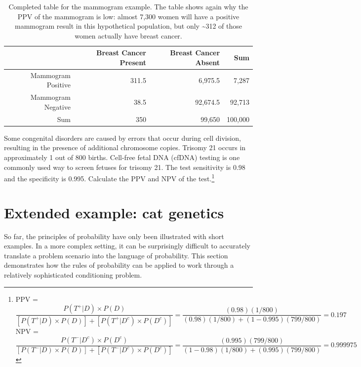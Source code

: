 \begin{table}[ht]
	\centering
	\begin{tabular}{rrrr}
		\hline
		& Breast Cancer Present & Breast Cancer Absent & Sum \\ 
		\hline
		Mammogram Positive & 311.5 & 6,975.5 & 7,287 \\ 
		Mammogram Negative &  38.5 & 92,674.5 & 92,713 \\ 
		Sum & 350 & 99,650 & 100,000 \\ 
		\hline
	\end{tabular}
	\caption{Completed table for the mammogram example. The table shows again why the PPV of the mammogram is low: almost 7,300 women will have a positive mammogram result in this hypothetical population, but only \textasciitilde312 of those women actually have breast cancer.}
	\label{tableMammogramExample}
\end{table}

\begin{exercise}
	Some congenital disorders are caused by errors that occur during cell division, resulting in the presence of additional chromosome copies. Trisomy 21 occurs in approximately 1 out of 800 births. Cell-free fetal DNA (cfDNA) testing is one commonly used way to screen fetuses for trisomy 21. The test sensitivity is 0.98 and the specificity is 0.995. Calculate the PPV and NPV of the test.\footnote{PPV = $\dfrac{P(T^{+}|D) \times P(D)}{[P(T^{+}|D) \times P(D)] + [P(T^{+}|D^c) \times P(D^c)]} = \dfrac{(0.98)(1/800)}{(0.98)(1/800) + (1 - 0.995)(799/800)} = 0.197$ \\ NPV = $\dfrac{P(T^{-}|D^c) \times P(D^c)}{[P(T^{-}|D) \times P(D)] + [P(T^{-}|D^c) \times P(D^c)]} = \dfrac{(0.995)(799/800)}{(1-0.98)(1/800) + (0.995)(799/800)} = 0.999975$}
\end{exercise}



\newpage


\section[Extended example]{Extended example: cat genetics}

So far, the principles of probability have only been illustrated with short examples. In a more complex setting, it can be surprisingly difficult to accurately translate a problem scenario into the language of probability. This section demonstrates how the rules of probability can be applied to work through a relatively sophisticated conditioning problem.

